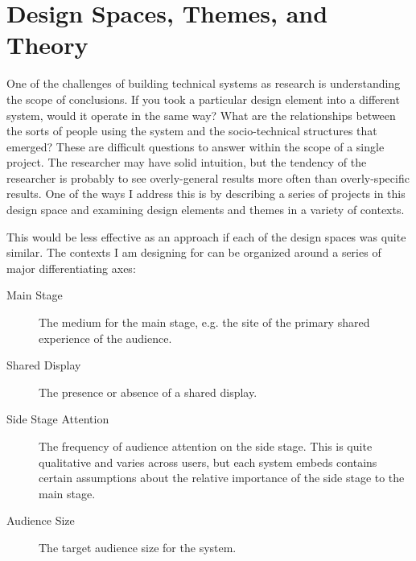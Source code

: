 

\section{Design Spaces, Themes, and Theory}

One of the challenges of building technical systems as research is understanding the scope of conclusions. If you took a particular design element into a different system, would it operate in the same way? What are the relationships between the sorts of people using the system and the socio-technical structures that emerged? These are difficult questions to answer within the scope of a single project. The researcher may have solid intuition, but the tendency of the researcher is probably to see overly-general results more often than overly-specific results. One of the ways I address this is by describing a series of projects in this design space and examining design elements and themes in a variety of contexts.

This would be less effective as an approach if each of the design spaces was quite similar. The contexts I am designing for can be organized around a series of major differentiating axes:

\begin{description}
\item[Main Stage]{The medium for the main stage, e.g. the site of the primary shared experience of the audience.}
\item[Shared Display]{The presence or absence of a shared display.}
\item[Side Stage Attention]{The frequency of audience attention on the side stage. This is quite qualitative and varies across users, but each system embeds contains certain assumptions about the relative importance of the side stage to the main stage.}
\item[Audience Size]{The target audience size for the system.}
\end{description}

